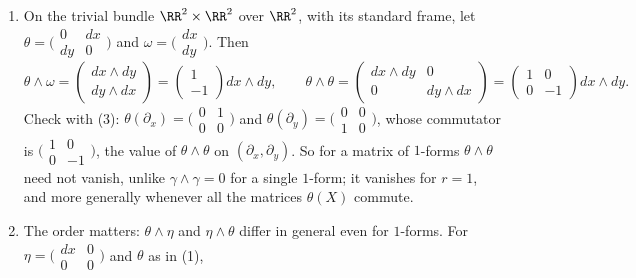\begin{example}\label{connections:example-products}
\begin{enumerate}
\item On the trivial bundle $\RR^2 \times \RR^2$ over $\RR^2$, with its standard frame, let $\theta = \bigl(\begin{smallmatrix} 0 & dx\\ dy & 0\end{smallmatrix}\bigr)$ and $\omega = \bigl(\begin{smallmatrix} dx\\ dy\end{smallmatrix}\bigr)$.
Then
\[
\theta \wedge \omega = \begin{pmatrix} dx \wedge dy\\ dy \wedge dx\end{pmatrix} = \begin{pmatrix} 1\\ -1\end{pmatrix}dx \wedge dy, \qquad
\theta \wedge \theta = \begin{pmatrix} dx \wedge dy & 0\\ 0 & dy \wedge dx\end{pmatrix} = \begin{pmatrix} 1 & 0\\ 0 & -1\end{pmatrix}dx \wedge dy .
\]
Check with (3): $\theta(\partial_x) = \bigl(\begin{smallmatrix} 0 & 1\\ 0 & 0\end{smallmatrix}\bigr)$ and $\theta(\partial_y) = \bigl(\begin{smallmatrix} 0 & 0\\ 1 & 0\end{smallmatrix}\bigr)$, whose commutator is
$\bigl(\begin{smallmatrix} 1 & 0\\ 0 & -1\end{smallmatrix}\bigr)$, the value of $\theta \wedge \theta$ on $(\partial_x, \partial_y)$. So for a matrix of $1$-forms $\theta \wedge \theta$ need not vanish, unlike
$\gamma \wedge \gamma = 0$ for a single $1$-form; it vanishes for $r = 1$, and more generally whenever all the matrices $\theta(X)$ commute.
\item The order matters: $\theta \wedge \eta$ and $\eta \wedge \theta$ differ in general even for $1$-forms. For $\eta = \bigl(\begin{smallmatrix} dx & 0\\ 0 & 0\end{smallmatrix}\bigr)$ and $\theta$ as in (1),

\end{enumerate}
\end{example}
